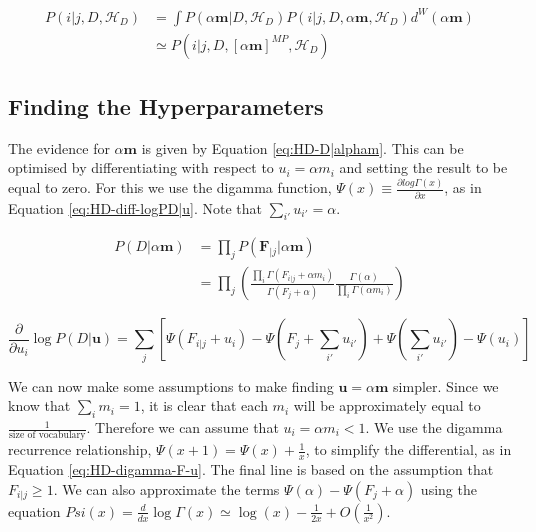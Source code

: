 \begin{align}
P(i|j,D,\mathscr{H}_{D})&=\int P(\alpha\boldsymbol{m}|D,\mathscr{H}_{D})P(i|j,D,\alpha\boldsymbol{m},\mathscr{H}_{D})d^{W}(\alpha\boldsymbol{m}) \nonumber
\\
&\simeq P(i|j,D,[\alpha\boldsymbol{m}]^{MP},\mathscr{H}_{D})
\label{eq:HD-i|j-D-H}
\end{align}

\subsection{Finding the Hyperparameters}

The evidence for $\alpha\boldsymbol{m}$ is given by Equation \ref{eq:HD-D|alpham}. This can be optimised by differentiating with respect to $u_{i}=\alpha m_{i}$ and setting the result to be equal to zero. For this we use the digamma function, $\Psi(x)\equiv\frac{\partial log\Gamma(x)}{\partial x}$, as in Equation \ref{eq:HD-diff-logPD|u}. Note that $\sum_{i'}u_{i'}=\alpha$.

\begin{align}
P(D|\alpha\boldsymbol{m})&=\prod_{j}P(\boldsymbol{F}_{|j}|\alpha\boldsymbol{m}) \nonumber
\\
&=\prod_{j}\left(\frac{\prod_{i}\Gamma(F_{i|j}+\alpha m_{i})}{\Gamma(F_{j}+\alpha)}\frac{\Gamma(\alpha)}{\prod_{i}\Gamma(\alpha m_{i})}\right)
\label{eq:HD-D|alpham}
\end{align}

\begin{equation}
\frac{\partial}{\partial u_{i}}\log P(D|\boldsymbol{u})=\sum_{j}[\Psi(F_{i|j}+u_{i})-\Psi(F_{j}+\sum_{i'}u_{i'})+\Psi(\sum_{i'}u_{i'})-\Psi(u_{i})] 
\label{eq:HD-diff-logPD|u}
\end{equation}

We can now make some assumptions to make finding $\boldsymbol{u}=\alpha\boldsymbol{m}$ simpler. Since we know that $\sum_{i}m_{i}=1$, it is clear that each $m_{i}$ will be approximately equal to $\frac{1}{\text{size of vocabulary}}$. Therefore we can assume that $u_{i}=\alpha m_{i}<1$. We use the digamma recurrence relationship, $\Psi(x+1)=\Psi(x)+\frac{1}{x}$, to simplify the differential, as in Equation \ref{eq:HD-digamma-F-u}. The final line is based on the assumption that $F_{i|j}\geq 1$. We can also approximate the terms $\Psi(\alpha)-\Psi(F_{j}+\alpha)$ using the equation $Psi(x)=\frac{d}{dx}\log\Gamma(x)\simeq\log(x)-\frac{1}{2x}+O(\frac{1}{x^{2}})$.

